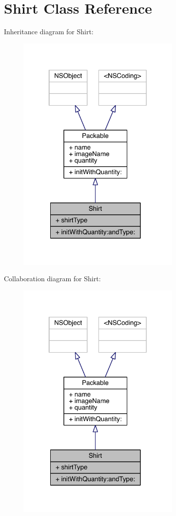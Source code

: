 \hypertarget{interface_shirt}{\section{Shirt Class Reference}
\label{interface_shirt}
}


Inheritance diagram for Shirt\-:\nopagebreak
\begin{figure}[H]
\begin{center}
\leavevmode
\includegraphics[width=229pt]{interface_shirt__inherit__graph}
\end{center}
\end{figure}


Collaboration diagram for Shirt\-:\nopagebreak
\begin{figure}[H]
\begin{center}
\leavevmode
\includegraphics[width=229pt]{interface_shirt__coll__graph}
\end{center}
\end{figure}

